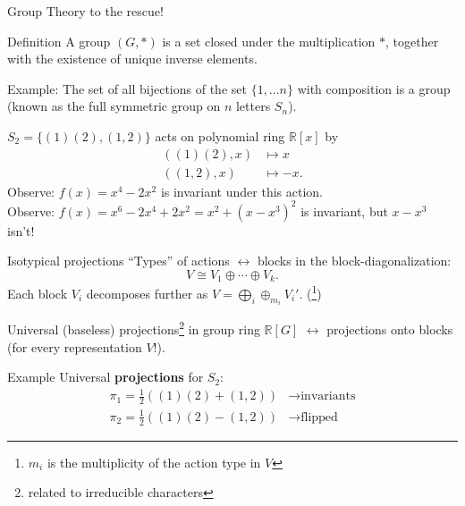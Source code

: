 \begin{frame}{Group Theory to the rescue!}
  \begin{block}{Definition}
    A \alert{group} $(G, *)$ is a set closed under the multiplication $*$, together with the existence of unique inverse elements.
  \end{block}
    {\small Example: The set of all bijections of the set $\{1,\ldots n\}$ with composition is a group (known as the full symmetric group on $n$ letters $S_n$).}

    $S_2 = \{(1)(2), (1,2)\}$ \alert{acts} on polynomial ring $\mathbb{R}[x]$ by
    \begin{align*}
      ((1)(2), x) & \mapsto x\\
      ((1, 2), x) & \mapsto -x.
    \end{align*}
    {\small Observe: $f(x) = x^4 - 2x^2$ is invariant under this action.\\
    Observe: $f(x) = x^6 - 2x^4 + 2x^2 = x^2 + (x-x^3)^2$ is invariant, but $x-x^3$ isn't!}

\end{frame}


\begin{frame}{Isotypical projections}
    ``Types'' of actions $\leftrightarrow$  blocks in the block-diagonalization:
    \[V \cong V_1 \oplus \cdots \oplus V_k.\]
    Each block $V_i$ decomposes further as
    $V = \bigoplus_i \oplus_{m_i} V_i'$. (\footnote{$m_i$ is the multiplicity of the action type in $V$})

    Universal (baseless) \alert{projections}\footnote{related to irreducible characters} in group ring $\mathbb{R}[G]$ $\leftrightarrow$ projections onto blocks (for every representation $V$!).
%
    \begin{block}{Example}
    \small
    Universal \textbf{projections} for $S_2$:\\[-0.2in]
    \begin{align*}
      \pi_1 = \frac{1}{2}((1)(2) + (1,2)) & \to\text{invariants}\\
      \pi_2 = \frac{1}{2}((1)(2) - (1,2)) & \to\text{flipped}
    \end{align*}
    \end{block}

\end{frame}

